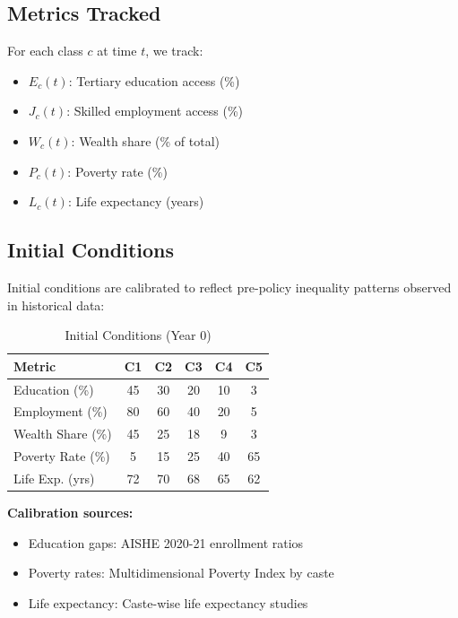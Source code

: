 \documentclass[10pt,twocolumn]{article}
\begin{document}
\subsection{Metrics Tracked}

For each class $c$ at time $t$, we track:

\begin{itemize}
    \item $E_c(t)$: Tertiary education access (\%)
    \item $J_c(t)$: Skilled employment access (\%)
    \item $W_c(t)$: Wealth share (\% of total)
    \item $P_c(t)$: Poverty rate (\%)
    \item $L_c(t)$: Life expectancy (years)
\end{itemize}

\subsection{Initial Conditions}

Initial conditions are calibrated to reflect pre-policy inequality patterns observed in historical data:

\begin{table}[H]
\centering
\caption{Initial Conditions (Year 0)}
\begin{tabular}{lccccc}
\toprule
\textbf{Metric} & \textbf{C1} & \textbf{C2} & \textbf{C3} & \textbf{C4} & \textbf{C5} \\
\midrule
Education (\%) & 45 & 30 & 20 & 10 & 3 \\
Employment (\%) & 80 & 60 & 40 & 20 & 5 \\
Wealth Share (\%) & 45 & 25 & 18 & 9 & 3 \\
Poverty Rate (\%) & 5 & 15 & 25 & 40 & 65 \\
Life Exp. (yrs) & 72 & 70 & 68 & 65 & 62 \\
\bottomrule
\end{tabular}
\end{table}

\textbf{Calibration sources:}
\begin{itemize}
    \item Education gaps: AISHE 2020-21 enrollment ratios \cite{aishe2021}
    \item Poverty rates: Multidimensional Poverty Index by caste \cite{mpi_caste}
    \item Life expectancy: Caste-wise life expectancy studies \cite{life_exp_caste}
\end{itemize}
\end{document}
